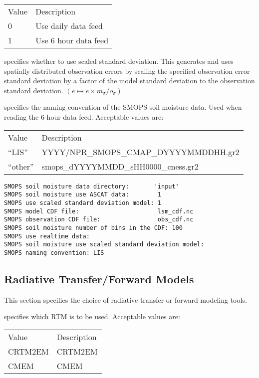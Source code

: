  \begin{tabular}{ll}
 Value & Description          \\
 0     & Use daily data feed  \\
 1     & Use 6 hour data feed \\
 \end{tabular}

  specifies whether to use scaled standard deviation.
 This generates and uses spatially distributed observation
 errors by scaling the specified observation error standard
 deviation by a factor of the model standard deviation to the
 observation standard deviation.
 $ ( e \mapsto e \times m_\sigma / o_\sigma ) $

  specifies the naming convention of the 
 SMOPS soil moisture data.  Used when reading the 6-hour data feed.
 Acceptable values are: 

 \begin{tabular}{ll}
 Value     & Description                            \\
 ``LIS''   & YYYY/NPR\_SMOPS\_CMAP\_DYYYYMMDDHH.gr2 \\
 ``other'' & smops\_dYYYYMMDD\_sHH0000\_cness.gr2   \\
 \end{tabular}
 

 \begin{Verbatim}[frame=single]
SMOPS soil moisture data directory:       'input'
SMOPS soil moisture use ASCAT data:        1
SMOPS use scaled standard deviation model: 1
SMOPS model CDF file:                      lsm_cdf.nc
SMOPS observation CDF file:                obs_cdf.nc
SMOPS soil moisture number of bins in the CDF: 100 
SMOPS use realtime data:
SMOPS soil moisture use scaled standard deviation model:
SMOPS naming convention: LIS
 \end{Verbatim}





 
 \subsection{Radiative Transfer/Forward Models} \label{ssec:rtms}
 This section specifies the choice of radiative transfer or forward
 modeling tools.

  specifies which RTM is to be used.
 Acceptable values are:

 \begin{tabular}{ll}
 Value         & Description   \\
 CRTM2EM       & CRTM2EM       \\
 CMEM          & CMEM          \\
 \end{tabular}

